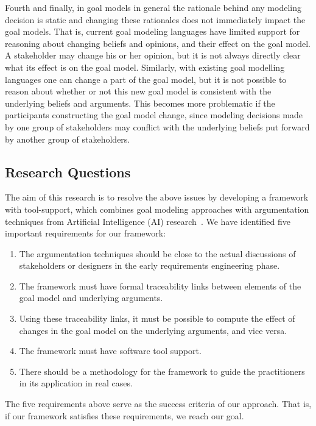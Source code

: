 Fourth and finally, in goal models in general the rationale behind any modeling decision is static and changing these rationales does not immediately impact the goal models. That is, current goal modeling languages have limited support for reasoning about changing beliefs and opinions, and their effect on the goal model. A stakeholder may change his or her opinion, but it is not always directly clear what its effect is on the goal model. Similarly, with existing goal modelling languages one can change a part of the goal model, but it is not possible to reason about whether or not this new goal model is consistent with the underlying beliefs and arguments. This becomes more problematic if the participants constructing the goal model change, since modeling decisions made by one group of stakeholders may conflict with the underlying beliefs put forward by another group of stakeholders.


\subsection{Research Questions}
 
The aim of this research is to resolve the above issues by developing a framework with tool-support, which combines goal modeling approaches with argumentation techniques from Artificial Intelligence (AI) research~\cite{BenchCaponDunne2007}. We have identified five important requirements for our framework: 
\begin{enumerate}
\item The argumentation techniques should be close to the actual discussions of stakeholders or designers in the early requirements engineering phase.
\item 
The framework must have formal traceability links between elements of the goal model and underlying arguments.
\item 
Using these traceability links, it must be possible to compute the effect of changes in the goal model on the underlying arguments, and vice versa.
\item 
The framework must have software tool support.
\item 
There should be a methodology for the framework to guide the practitioners in its application in real cases.
\end{enumerate}

The five requirements above serve as the success criteria of our approach. That is, if our framework satisfies these requirements, we reach our goal. 

